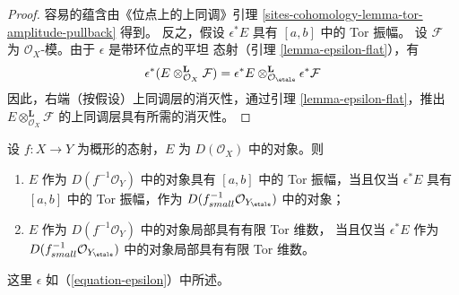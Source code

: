 \begin{proof}
容易的蕴含由《位点上的上同调》引理
\ref{sites-cohomology-lemma-tor-amplitude-pullback} 得到。
反之，假设 $\epsilon^*E$ 具有 $[a, b]$ 中的 Tor 振幅。
设 $\mathcal{F}$ 为 $\mathcal{O}_X$-模。由于 $\epsilon$ 是带环位点的平坦
态射（引理 \ref{lemma-epsilon-flat}），有
$$
\epsilon^*(E \otimes^\mathbf{L}_{\mathcal{O}_X} \mathcal{F})
=
\epsilon^*E
\otimes^\mathbf{L}_{\mathcal{O}_\etale}
\epsilon^*\mathcal{F}
$$
因此，右端（按假设）上同调层的消灭性，通过引理
\ref{lemma-epsilon-flat}，推出
$E \otimes^\mathbf{L}_{\mathcal{O}_X} \mathcal{F}$ 的上同调层具有所需的消灭性。
\end{proof}

\begin{lemma}
\label{lemma-tor-dimension-rel}
设 $f : X \to Y$ 为概形的态射，$E$ 为 $D(\mathcal{O}_X)$ 中的对象。则
\begin{enumerate}
\item $E$ 作为 $D(f^{-1}\mathcal{O}_Y)$ 中的对象具有 $[a, b]$ 中的
Tor 振幅，当且仅当 $\epsilon^*E$ 具有 $[a, b]$ 中的 Tor 振幅，作为
$D(f_{small}^{-1}\mathcal{O}_{Y_\etale})$ 中的对象；
\item $E$ 作为 $D(f^{-1}\mathcal{O}_Y)$ 中的对象局部具有有限 Tor 维数，
当且仅当 $\epsilon^*E$ 作为
$D(f_{small}^{-1}\mathcal{O}_{Y_\etale})$ 中的对象局部具有有限 Tor 维数。
\end{enumerate}
这里 $\epsilon$ 如（\ref{equation-epsilon}）中所述。
\end{lemma}

